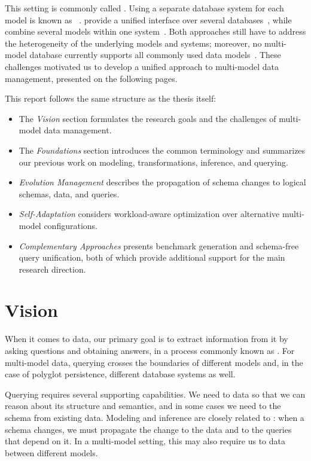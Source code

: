 This setting is commonly called . Using a separate database system for each model is known as ~\citep{PolyglotPersistance}.  provide a unified interface over several databases~\citep{9252014}, while  combine several models within one system~\citep{CSUR-Jiaheng}. Both approaches still have to address the heterogeneity of the underlying models and systems; moreover, no multi-model database currently supports all commonly used data models~\citep{DBEngines2026}. These challenges motivated us to develop a unified approach to multi-model data management, presented on the following pages.

This report follows the same structure as the thesis itself:
\begin{itemize}
    \item The \emph{Vision} section formulates the research goals and the challenges of multi-model data management.
    \item The \emph{Foundations} section introduces the common terminology and summarizes our previous work on modeling, transformations, inference, and querying.
    \item \emph{Evolution Management} describes the propagation of schema changes to logical schemas, data, and queries.
    \item \emph{Self-Adaptation} considers workload-aware optimization over alternative multi-model configurations.
    \item \emph{Complementary Approaches} presents benchmark generation and schema-free query unification, both of which provide additional support for the main research direction.
\end{itemize}


\section{Vision}

When it comes to data, our primary goal is to extract information from it by asking questions and obtaining answers, in a process commonly known as . For multi-model data, querying crosses the boundaries of different models and, in the case of polyglot persistence, different database systems as well.

Querying requires several supporting capabilities. We need to  data so that we can reason about its structure and semantics, and in some cases we need to  the schema from existing data. Modeling and inference are closely related to : when a schema changes, we must propagate the change to the data and to the queries that depend on it. In a multi-model setting, this may also require us to  data between different models.

